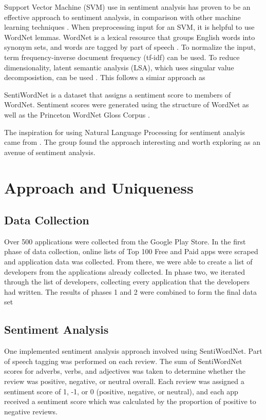 \documentclass{acm_proc_article-sp}
\begin{document}
Support Vector Machine (SVM) use in sentiment analysis has proven to be an effective approach to sentiment analysis, in comparison with other machine learning techniques \cite{Pang02thumbsup}.  When preprocessing input for an SVM, it is helpful to use WordNet lemmas.  WordNet is a lexical resource that groups English words into synonym sets, and words are tagged by part of speech \cite{Miller}.  To normalize the input, term frequency-inverse document frequency (tf-idf) can be used.  To reduce dimensionality, latent semantic analysis (LSA), which uses singular value decomposistion, can be used \cite{Deerwester90indexingby}.  This follows a simiar approach as \cite{Mullen04sentimentanalysis}

SentiWordNet is a dataset that assigns a sentiment score to members of WordNet.  Sentiment scores were generated using the structure of WordNet as well as the Princeton WordNet Gloss Corpus \cite{Baccianella10sentiwordnet}.

The inspiration for using Natural Language Processing for sentiment analyis came from \cite{Pandita:2013:WTA:2534766.2534812}. The group found the approach interesting and worth exploring as an avenue of sentiment analysis.

\section{Approach and Uniqueness}
\subsection{Data Collection}
Over 500 applications were collected from the Google Play Store. In the first phase of data collection, online lists of Top 100 Free and Paid apps were scraped and application data was collected. From there, we were able to create a list of developers from the applications already collected. In phase two, we iterated through the list of developers, collecting every application that the developers had written. The results of phases 1 and 2 were combined to form the final data set  
\subsection{Sentiment Analysis}
One implemented sentiment analysis approach involved using SentiWordNet.  Part of speech tagging was performed on each review. The sum of SentiWordNet scores for adverbs, verbs, and adjectives was taken to determine whether the review was positive, negative, or neutral overall.  Each review was assigned a sentiment score of 1, -1, or 0 (positive, negative, or neutral), and each app received a sentiment score which was calculated by the proportion of positive to negative reviews.
\end{document}
